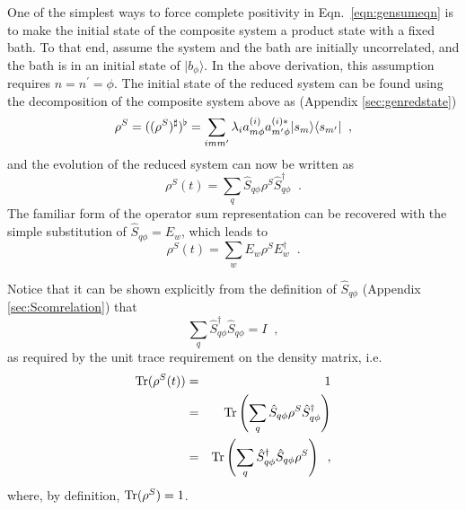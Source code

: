 One of the simplest ways to force complete positivity in Eqn.\ \ref{eqn:gensumeqn} is to make the initial state of the composite system a product state with a fixed bath.  To that end, assume the system and the bath are initially uncorrelated, and the bath is in an initial state of $|b_\phi\rangle$.  In the above derivation, this assumption requires $n=n^\prime = \phi$.  The initial state of the reduced system can be found using the decomposition of the composite system above as (Appendix \ref{sec:genredstate})
$$
\rho^S = ((\rho^{S})^\sharp)^\flat = \sum_{imm^\prime} \lambda_i a_{m\phi}^{(i)} a_{m^\prime \phi}^{(i)*} |s_m\rangle\langle s_{m^\prime}|\;\;,
$$
and the evolution of the reduced system can now be written as
$$
\rho^S(t) = \sum_{q} \hat{S}_{q\phi} \rho^S \hat{S}_{q\phi}^\dagger\;\;.
$$
The familiar form of the operator sum representation can be recovered with the simple substitution of $\hat{S}_{q\phi} = E_w$, which leads to
$$
\rho^S(t) = \sum_{w} E_{w} \rho^S E_{w}^\dagger\;\;.
$$

Notice that it can be shown explicitly from the definition of $\hat{S}_{q\phi}$ (Appendix \ref{sec:Scomrelation}) that
$$
\sum_q \hat{S}_{q\phi}^\dagger \hat{S}_{q\phi} = I\;\;,
$$
as required by the unit trace requirement on the density matrix, i.e.
\begin{eqnarray}
\operatorname{Tr}(\rho^S(t)) &=& 1\\
&=& \operatorname{Tr}\left( \sum_{q} \hat{S}_{q\phi} \rho^S \hat{S}_{q\phi}^\dagger \right)\\
&=& \operatorname{Tr}\left( \sum_{q} \hat{S}_{q\phi}^\dagger \hat{S}_{q\phi} \rho^S \right)\;\;,
\end{eqnarray}
where, by definition, $\operatorname{Tr}(\rho^S) = 1$.

